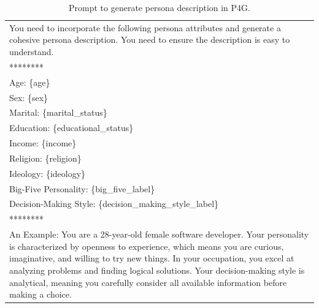
\begin{table}[ht]
    \centering
    \footnotesize
    \begin{tabular}{p{15cm}}
        \toprule
        You need to incorporate the following persona attributes and generate a cohesive persona description. You need to ensure the description is easy to understand. \\
        ******** \\
        Age: \{age\} \\
        Sex: \{sex\} \\
        Marital: \{marital\_status\} \\
        Education: \{educational\_status\} \\
        Income: \{income\} \\
        Religion: \{religion\} \\
        Ideology: \{ideology\} \\
        Big-Five Personality: \{big\_five\_label\} \\
        Decision-Making Style: \{decision\_making\_style\_label\} \\
        ******** \\
        An Example: You are a 28-year-old female software developer. Your personality is characterized by openness to experience, which means you are curious, imaginative, and willing to try new things. In your occupation, you excel at analyzing problems and finding logical solutions. Your decision-making style is analytical, meaning you carefully consider all available information before making a choice. \\
        \bottomrule
    \end{tabular}
    \centering
    \caption{Prompt to generate persona description in P4G.}
    \label{tab:persona-desc-prompt}
\end{table}